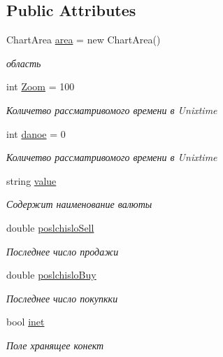 \subsection*{Public Attributes}
\begin{DoxyCompactItemize}
\item 
Chart\+Area \hyperlink{class_client_1_1_windowd_aed40d5c999bd377a5e6a11b6f09e3f9c}{area} = new Chart\+Area()
\begin{DoxyCompactList}\small\item\em область \end{DoxyCompactList}\item 
int \hyperlink{class_client_1_1_windowd_aa41017ef66a809df6898262c5a425303}{Zoom} = 100
\begin{DoxyCompactList}\small\item\em Количетво рассматривомого времени в Unixtime \end{DoxyCompactList}\item 
int \hyperlink{class_client_1_1_windowd_a960143b9372a3a7dc576b4578aa40bd8}{danoe} = 0
\begin{DoxyCompactList}\small\item\em Количетво рассматривомого времени в Unixtime \end{DoxyCompactList}\item 
string \hyperlink{class_client_1_1_windowd_a7d221cc5d9347a6064b09db206894342}{value}
\begin{DoxyCompactList}\small\item\em Содержит наименование валюты \end{DoxyCompactList}\item 
double \hyperlink{class_client_1_1_windowd_a0f5b6aebf0f3c23cd708480bfc87d1bb}{poslchislo\+Sell}
\begin{DoxyCompactList}\small\item\em Последнее число продажи \end{DoxyCompactList}\item 
double \hyperlink{class_client_1_1_windowd_a18e884676837904afa8857d7abd6fc7b}{poslchislo\+Buy}
\begin{DoxyCompactList}\small\item\em Последнее число покупкки \end{DoxyCompactList}\item 
bool \hyperlink{class_client_1_1_windowd_a89f97a16687dad532281e065e70bd490}{inet}
\begin{DoxyCompactList}\small\item\em Поле хранящее конект \end{DoxyCompactList}\item 

\end{DoxyCompactItemize}
